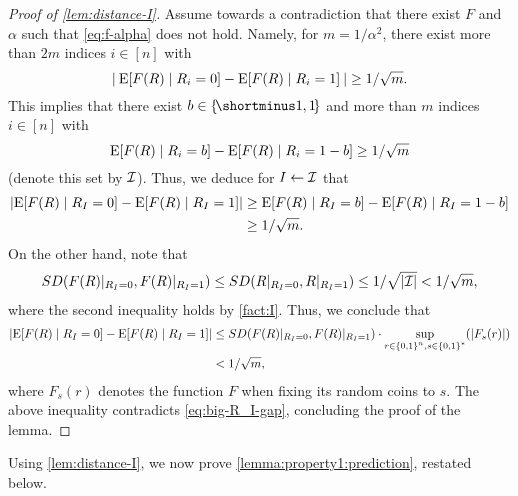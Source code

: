 \begin{proof}[Proof of \cref{lem:distance-I}]
    Assume towards a contradiction that there exist $F$ and $\alpha$ such that \cref{eq:f-alpha} does not hold.
    Namely, for $m = 1/\alpha^2$, there exist more than $2m$ indices $i \in [n]$ with $$\size{\:\ex{F(R) \mid R_i = 0}-\ex{F(R) \mid R_i = 1}\:}\geq 1/\sqrt{m}.$$
    This implies that there exist $b \in \oo$ and more than $m$ indices $i \in [n]$ with $$\ex{F(R) \mid R_i = b}-\ex{F(R) \mid R_i = 1-b} \geq 1/\sqrt{m}$$ (denote this set by ${\cal I}$). 
    Thus, we deduce for $I \gets {\cal I}$ that
    \begin{align}\label{eq:big-R_I-gap}
        \size{\ex{F(R) \mid R_I = 0}-\ex{F(R) \mid R_I = 1}} 
        &\geq \ex{F(R) \mid R_I = b}-\ex{F(R) \mid R_I = 1-b}\\
        &\geq 1/\sqrt{m}.\nonumber
    \end{align}
    On the other hand, note that
    \begin{align*}
        SD(F(R)|_{R_I=0},F(R)|_{R_I=1})
        \leq SD(R|_{R_I=0},R|_{R_I=1})
        \leq 1/\sqrt{\size{\cI}}
        < 1/\sqrt{m},
    \end{align*}
    where the second inequality holds by \cref{fact:I}.
    Thus, we conclude that
    \begin{align*}
        \size{\ex{F(R) \mid R_I = 0}-\ex{F(R) \mid R_I = 1}}
        &\leq SD(F(R)|_{R_I=0},F(R)|_{R_I=1}) \cdot \sup_{r \in \zo^n, s \in \zo^*}(\size{F_s(r)})\\
        &< 1/\sqrt{m},
    \end{align*}
    where $F_s(r)$ denotes the function $F$ when fixing its random coins to $s$. 
    The above inequality contradicts \cref{eq:big-R_I-gap}, concluding the proof of the lemma.
\end{proof}

Using \cref{lem:distance-I}, we now prove \cref{lemma:property1:prediction}, restated below.

